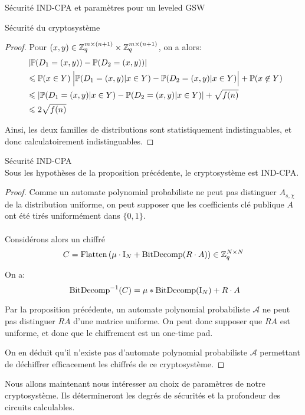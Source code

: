 \begin{section}{Sécurité IND-CPA et paramètres pour un leveled GSW}
\begin{subsection}{Sécurité du cryptosystème}
\begin{proof}
\vspace{0.2cm}
	Pour $(x,y)\in \mathbb{Z}_q^{m \times (n+1)} \times \mathbb{Z}_q^{m \times (n+1)}$, on a alors:
	\begin{align*}
	&\left|\PP(D_1 = (x,y)) - \PP(D_2 = (x,y))\right| \\ &\leqslant \PP(x\in Y)\:
	\Big|\PP(D_1 
	= (x,y)| x\in Y) - \PP(D_2 = (x,y)|x\in Y)\Big| + \PP(x \not\in Y)  \\
	&\leqslant |\PP(D_1 = (x,y) | x \in Y) - \PP(D_2 = (x,y)|x \in Y)| + \sqrt{f(n)} \\
	&\leqslant 2\sqrt{f(n)} 
	\end{align*}
	
	Ainsi, les deux familles de distributions sont statistiquement indistinguables, et donc calculatoirement
	indistinguables.	
	\end{proof}
	\begin{thm}{Sécurité IND-CPA}\\
	\label{ind_cpa}
	Sous les hypothèses de la proposition précédente, le
	cryptosystème est IND-CPA.
	\end{thm}
	\begin{proof}
	Comme un automate polynomial probabiliste ne peut pas distinguer
	$A_{s, \chi}$ de la distribution uniforme, on peut supposer que les coefficients 
	clé publique $A$ ont été tirés uniformément dans $\{ 0,1 \}$.

	\paragraph{}
	Considérons alors un chiffré 
	\[C = \text{Flatten}\left(\mu \cdot \text{I}_N + \text{BitDecomp}(R\cdot A)\right) \in
	\mathbb{Z}_q^{N\times N}\]

	On a:
	\[ \bitdecomp^{-1}(C) = \mu * \bitdecomp(\id_N) + R\cdot A\]

	Par la proposition précédente, un automate polynomial probabiliste $\mathcal{A}$
	ne peut pas distinguer $RA$ d'une matrice uniforme. On peut donc
	supposer que $RA$ est uniforme, et donc que le chiffrement est 
	un one-time pad.

	On en déduit qu'il n'existe pas d'automate polynomial probabiliste
	$\mathcal{A}$ permettant de déchiffrer efficacement les chiffrés de ce cryptosystème.
	\end{proof}
	
	\end{subsection}

Nous allons maintenant nous intéresser au choix de paramètres de notre
cryptosystème. Ils détermineront les degrés de sécurités et la profondeur des circuits calculables.


\end{section}
